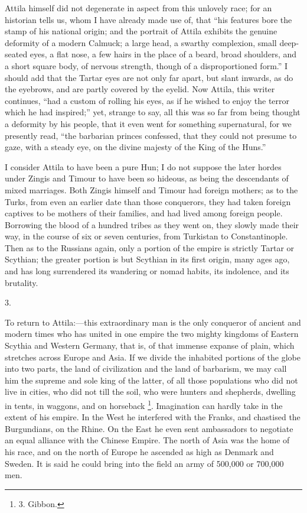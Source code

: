 Attila himself did not
degenerate in aspect from this unlovely race; for an historian tells
us, whom I have already made use of, that ``his features bore the stamp
of his national origin; and the portrait of Attila exhibits the
genuine deformity of a modern Calmuck; a large head, a swarthy
complexion, small deep-seated eyes, a flat nose, a few hairs in the
place of a beard, broad shoulders, and a short square body, of nervous
strength, though of a disproportioned form.'' I should add that the
Tartar eyes are not only far apart, but slant inwards, as do the
eyebrows, and are partly covered by the eyelid. Now Attila, this
writer continues, ``had a custom of rolling his eyes, as if he wished
to enjoy the terror which he had inspired;'' yet, strange to say, all
this was so far from being thought a deformity by his people, that it
even went for something supernatural, for we presently read, ``the
barbarian princes confessed, that they could not presume to gaze, with
a steady eye, on the divine majesty of the King of the Huns.''

I consider Attila to have been
a pure Hun; I do not suppose the later hordes under Zingis and Timour
to have been so hideous, as being the descendants of mixed marriages.
Both Zingis himself and Timour had foreign mothers; as to the Turks,
from even an earlier date than those conquerors, they had taken
foreign captives to be mothers of their families, and had lived among
foreign people. Borrowing the blood of a hundred tribes as they went
on, they slowly made their way, in the course of six or seven
centuries, from Turkistan to Constantinople. Then as to the Russians
again, only a portion of the empire is strictly Tartar or Scythian;
the greater portion is but Scythian in its first origin, many ages
ago, and has long surrendered its wandering or nomad habits, its
indolence, and its brutality.

3.

To return to Attila:—this
extraordinary man is the only conqueror of ancient and modern times
who has united in one empire the two mighty kingdoms of Eastern
Scythia and Western Germany, that is, of that immense expanse of
plain, which stretches across Europe and Asia. If we divide the
inhabited portions of the globe into two parts, the land of
civilization and the land of barbarism, we may call him the supreme
and sole king of the latter, of all those populations who did not live
in cities, who did not till the soil, who were hunters and shepherds,
dwelling in tents, in waggons, and on horseback \footnote{3.
Gibbon.}. Imagination can hardly take in the extent of his empire. In
the West he interfered with the Franks, and chastised the Burgundians,
on the Rhine. On the East he even sent ambassadors to negotiate an
equal alliance with the Chinese Empire. The north of Asia was the home
of his race, and on the north of Europe he ascended as high as Denmark
and Sweden. It is said he could bring into the field an army of
500,000 or 700,000 men.

